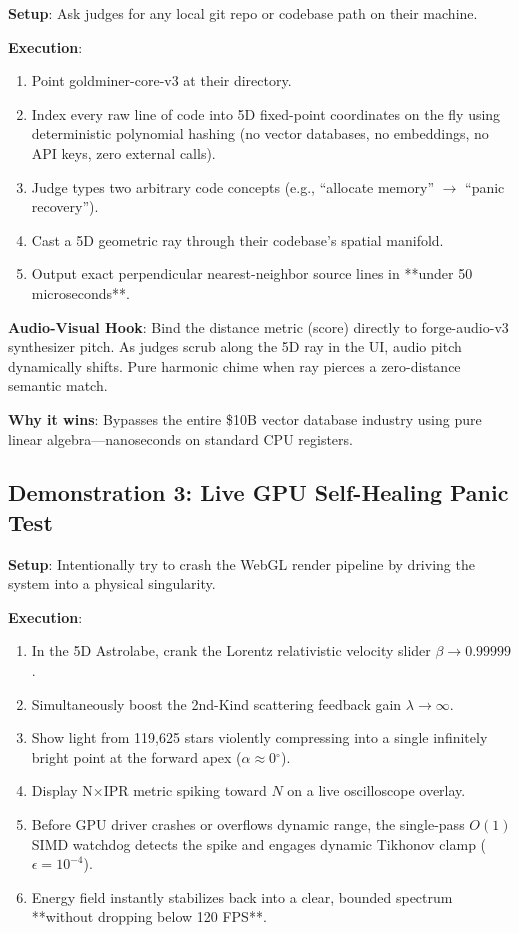 \documentclass[11pt,oneside]{article}
\theoremstyle{definition}
\begin{document}
\textbf{Setup}: Ask judges for any local git repo or codebase path on their machine.

\textbf{Execution}:
\begin{enumerate}
  \item Point goldminer-core-v3 at their directory.
  \item Index every raw line of code into 5D fixed-point coordinates on the fly using deterministic polynomial hashing (no vector databases, no embeddings, no API keys, zero external calls).
  \item Judge types two arbitrary code concepts (e.g., ``allocate memory'' $\to$ ``panic recovery'').
  \item Cast a 5D geometric ray through their codebase's spatial manifold.
  \item Output exact perpendicular nearest-neighbor source lines in **under 50 microseconds**.
\end{enumerate}

\textbf{Audio-Visual Hook}: Bind the distance metric (score) directly to forge-audio-v3 synthesizer pitch. As judges scrub along the 5D ray in the UI, audio pitch dynamically shifts. Pure harmonic chime when ray pierces a zero-distance semantic match.

\textbf{Why it wins}: Bypasses the entire \$10B vector database industry using pure linear algebra—nanoseconds on standard CPU registers.

\subsection{Demonstration 3: Live GPU Self-Healing Panic Test}

\textbf{Setup}: Intentionally try to crash the WebGL render pipeline by driving the system into a physical singularity.

\textbf{Execution}:
\begin{enumerate}
  \item In the 5D Astrolabe, crank the Lorentz relativistic velocity slider $\beta \to 0.99999$.
  \item Simultaneously boost the 2nd-Kind scattering feedback gain $\lambda \to \infty$.
  \item Show light from 119,625 stars violently compressing into a single infinitely bright point at the forward apex ($\alpha \approx 0\ensuremath{^\circ}$).
  \item Display N\ensuremath{\times}IPR metric spiking toward $N$ on a live oscilloscope overlay.
  \item Before GPU driver crashes or overflows dynamic range, the single-pass $O(1)$ SIMD watchdog detects the spike and engages dynamic Tikhonov clamp ($\epsilon = 10^{-4}$).
  \item Energy field instantly stabilizes back into a clear, bounded spectrum **without dropping below 120 FPS**.
\end{enumerate}
\end{document}
